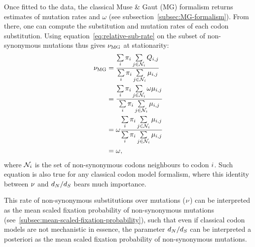 Once fitted to the data, the classical Muse \& Gaut (\acrshort{MG}) formalism returns estimates of mutation rates and $\omega$ (see subsection~\ref{subsec:MG-formalism}).
From there, one can compute the substitution and mutation rates of each codon substitution.
Using equation~\ref{eq:relative-sub-rate} on the subset of non-synonymous mutations thus gives $\nu_{\text{MG}}$ at stationarity:
\begin{align}
    \nu_{\text{MG}} & = \dfrac{ \sum\limits_{{i}} \pi_{{i}} \sum\limits_{{j} \in \mathcal{N}_{{i}}} Q_{{i}, {j}}}{\sum\limits_{{i}} \pi_{{i}} \sum\limits_{{j} \in \mathcal{N}_{{i}}} \mu_{{i}, {j}}} \\
    & = \dfrac{ \sum\limits_{{i}} \pi_{{i}} \sum\limits_{{j} \in \mathcal{N}_{{i}}} \omega \mu_{{i}, {j}}}{\sum\limits_{{i}} \pi_{{i}} \sum\limits_{{j} \in \mathcal{N}_{{i}}} \mu_{{i}, {j}}} \\
    & = \omega \dfrac{ \sum\limits_{{i}} \pi_{{i}} \sum\limits_{{j} \in \mathcal{N}_{{i}}} \mu_{{i}, {j}}}{\sum\limits_{{i}} \pi_{{i}} \sum\limits_{{j} \in \mathcal{N}_{{i}}} \mu_{{i}, {j}}} \\
    & = \omega,
\end{align}
where $\mathcal{N}_{{i}}$ is the set of non-synonymous codons neighbours to codon ${i}$.
Such equation is also true for any classical codon model formalism, where this identity between $\nu$ and $d_N / d_S$ bears much importance.

This rate of non-synonymous substitutions over mutations ($\nu$) can be interpreted as the mean scaled fixation probability of non-synonymous mutations (see~\ref{subsec:mean-scaled-fixation-probability}), such that even if classical codon models are not mechanistic in essence, the parameter $d_N / d_S$ can be interpreted a posteriori as the mean scaled fixation probability of non-synonymous mutations.


